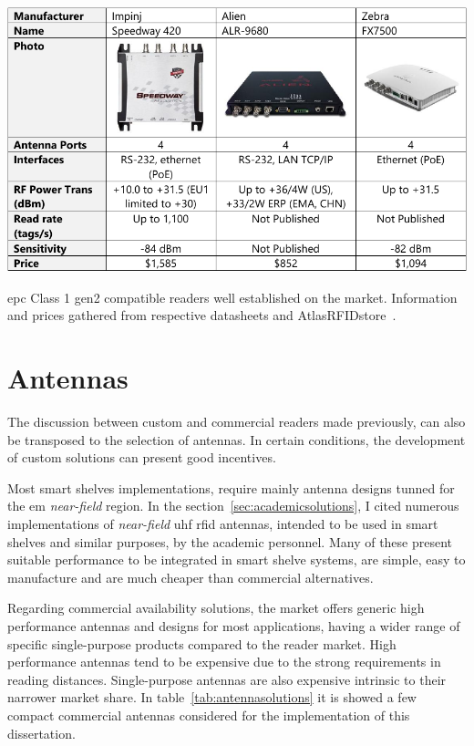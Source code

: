 \begin{table}
    \centering
    \includegraphics[width=\linewidth]{./figs/02-state-of-the-art/table_commercialreaders.pdf}
    \caption[\ac{epc} Class 1 \ac{gen2} compatible readers well established on the market]{\ac{epc} Class 1 \ac{gen2} compatible readers well established on the market. Information and prices gathered from respective datasheets and AtlasRFIDstore~\cite{AtlasRFIDstoreBuyRFID}.}
    \label{tab:readercommercialsolutions}
\end{table}


\section{Antennas}

The discussion between custom and commercial readers made previously, can also be transposed to the selection of antennas. In certain conditions, the development of custom solutions can present good incentives.

Most smart shelves implementations, require mainly antenna designs tunned for the \ac{em} \emph{near-field} region.
In the section~\ref{sec:academicsolutions}, I cited numerous implementations of \emph{near-field} \ac{uhf} \ac{rfid} antennas, intended to be used in smart shelves and similar purposes, by the academic personnel. Many of these present suitable performance to be integrated in smart shelve systems, are simple, easy to manufacture and are much cheaper than commercial alternatives. 

Regarding commercial availability solutions, the market offers generic high performance antennas and designs for most applications, having a wider range of specific single-purpose products compared to the reader market. 
High performance antennas tend to be expensive due to the strong requirements in reading distances. Single-purpose antennas are also expensive intrinsic to their narrower market share. 
In table~\ref{tab:antennasolutions} it is showed a few compact commercial antennas considered for the implementation of this dissertation.

